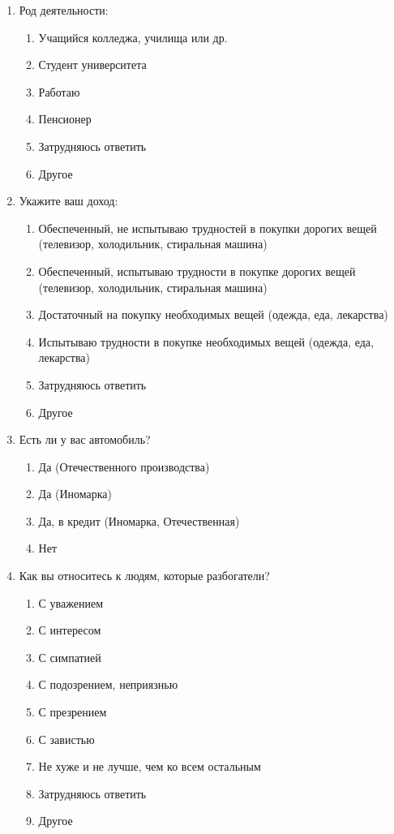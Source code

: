 \begin{enumerate}
    \item Род деятельности:
    \begin{enumerate}
        \item[\dline] Учащийся колледжа, училища или др.
        \item[\dline] Студент университета
        \item[\dline]Работаю
        \item[\dline] Пенсионер
        \item[\dline] Затрудняюсь ответить
        \item[] Другое \hugeline 
    \end{enumerate}

    \item Укажите ваш доход:
    \begin{enumerate}
        \item[\dline] Обеспеченный, не испытываю трудностей в покупки дорогих 
            вещей (телевизор, холодильник, стиральная машина)
        \item[\dline] Обеспеченный, испытываю трудности в покупке дорогих 
            вещей (телевизор, холодильник, стиральная машина)
        \item[\dline] Достаточный на покупку необходимых вещей (одежда, еда, 
            лекарства)
        \item[\dline] Испытываю трудности в покупке необходимых вещей 
            (одежда, еда, лекарства)
        \item[\dline] Затрудняюсь ответить
        \item[] Другое \hugeline 
    \end{enumerate}

    \item Есть ли у вас автомобиль?
    \begin{enumerate}
        \item[\dline] Да (Отечественного производства)
        \item[\dline] Да (Иномарка)
        \item[\dline] Да, в кредит (Иномарка, Отечественная)
        \item[\dline] Нет
    \end{enumerate}

    \item Как вы относитесь к людям, которые разбогатели?
    \begin{enumerate}
        \item[\dline] С уважением
        \item[\dline] С интересом
        \item[\dline] С симпатией
        \item[\dline] С подозрением, неприязнью
        \item[\dline] С презрением
        \item[\dline] С завистью
        \item[\dline] Не хуже и не лучше, чем ко всем остальным
        \item[\dline] Затрудняюсь ответить
        \item[] Другое \hugeline 
    \end{enumerate}


\end{enumerate}
